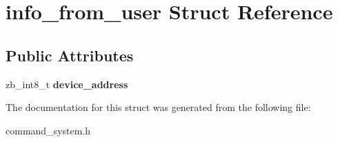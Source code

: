\hypertarget{structinfo__from__user}{}\section{info\+\_\+from\+\_\+user Struct Reference}
\label{structinfo__from__user}
\subsection*{Public Attributes}
\begin{DoxyCompactItemize}
\item 
\mbox{\label{structinfo__from__user_ae97f4f846bfc0161477e78b7276cf558}} 
zb\+\_\+int8\+\_\+t {\bfseries device\+\_\+address}
\end{DoxyCompactItemize}


The documentation for this struct was generated from the following file\+:\begin{DoxyCompactItemize}
\item 
command\+\_\+system.\+h\end{DoxyCompactItemize}
